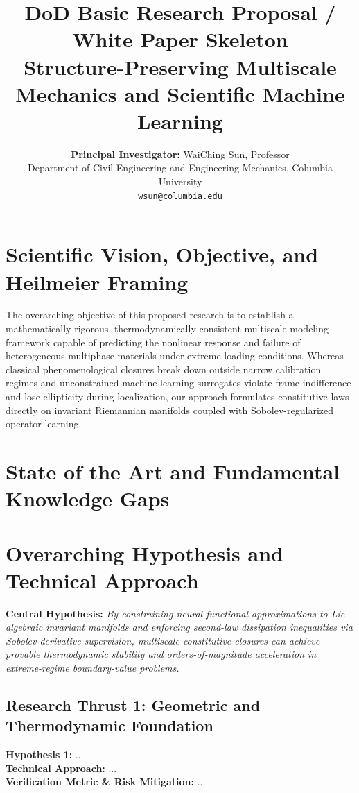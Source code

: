 \documentclass[11pt]{article}
\title{\textbf{DoD Basic Research Proposal / White Paper Skeleton} \\
\large Structure-Preserving Multiscale Mechanics and Scientific Machine Learning}
\author{\textbf{Principal Investigator:} WaiChing Sun, Professor \\
Department of Civil Engineering and Engineering Mechanics, Columbia University \\
\texttt{wsun@columbia.edu}}
\date{}
\begin{document}
\maketitle

\section{Scientific Vision, Objective, and Heilmeier Framing}
The overarching objective of this proposed research is to establish a mathematically rigorous, thermodynamically consistent multiscale modeling framework capable of predicting the nonlinear response and failure of heterogeneous multiphase materials under extreme loading conditions. Whereas classical phenomenological closures break down outside narrow calibration regimes and unconstrained machine learning surrogates violate frame indifference and lose ellipticity during localization, our approach formulates constitutive laws directly on invariant Riemannian manifolds coupled with Sobolev-regularized operator learning.

\section{State of the Art and Fundamental Knowledge Gaps}

\section{Overarching Hypothesis and Technical Approach}

\noindent\textbf{Central Hypothesis:} \textit{By constraining neural functional approximations to Lie-algebraic invariant manifolds and enforcing second-law dissipation inequalities via Sobolev derivative supervision, multiscale constitutive closures can achieve provable thermodynamic stability and orders-of-magnitude acceleration in extreme-regime boundary-value problems.}

\subsection{Research Thrust 1: Geometric and Thermodynamic Foundation}
\noindent\textbf{Hypothesis 1:} ... \\
\textbf{Technical Approach:} ... \\
\textbf{Verification Metric \& Risk Mitigation:} ...
\end{document}
